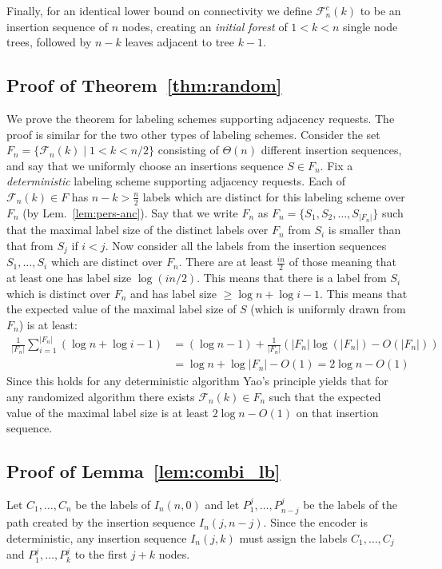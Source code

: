 \documentclass{llncs}
\newcommand{\abs}[1]{\left | #1 \right |}
\begin{document}
Finally, for an identical  lower bound on connectivity we define
$\mathcal{F}^c_n(k)$ to be an  insertion sequence   of  $n$ nodes, creating  an
\emph{initial  forest } of  $1 < k < n $ single node trees, followed by  $n-k$
leaves adjacent to tree $k-1$. 

\subsection{Proof of Theorem~\ref{thm:random}} \label{proof:random}
\newcommand{\F}{\mathcal{F}}
We  prove the theorem for labeling schemes supporting adjacency requests.
The proof is similar for the two other types of labeling schemes.
Consider the set $F_n = \{\F_n(k) \mid 1 < k < n/2\}$ consisting of $\Theta(n)$
different insertion sequences, and say that we uniformly choose an insertions
sequence $S \in F_n$.
Fix a \emph{deterministic} labeling scheme supporting adjacency requests.
Each of $\F_n(k) \in F$ has $n-k > \frac{n}{2}$
labels which are distinct for this labeling scheme over $F_n$ (by
Lem.~\ref{lem:pers-anc}).
Say that we write $F_n$ as $F_n = \{S_1, S_2,\ldots, S_{\abs{F_n}}\}$ such that
the maximal label size of the distinct labels over $F_n$ from $S_i$
is smaller than that from $S_j$ if $i < j$. Now consider all the labels from the
insertion sequences $S_1,\ldots,S_i$ which are distinct over $F_n$. There are at
least $\frac{in}{2}$ of those meaning that at least one has label size $\log(in/2)$.
This means that there is a label from $S_i$ which is distinct over $F_n$ and
has label size $\ge \log n + \log i - 1$. This means that the expected value of
the maximal label size of $S$ (which is uniformly drawn from $F_n$) is at least:
\begin{align*}
\frac{1}{\abs{F_n}} \sum_{i=1}^{\abs{F_n}}
\left ( \log n + \log i - 1 \right )
& =
(\log n - 1) +
\frac{1}{\abs{F_n}}
\left (
    \abs{F_n}\log(\abs{F_n}) - O(\abs{F_n})
\right )
\\
& =
\log n + \log \abs{F_n} - O(1)
=
2\log n - O(1)
\end{align*}
Since this holds for any deterministic algorithm Yao's principle yields that
for any randomized algorithm there exists $\F_n(k) \in F_n$ such that the
expected value of the maximal label size is at least $2\log n - O(1)$ on that
insertion sequence.

\subsection{Proof of Lemma~\ref{lem:combi_lb}} \label{Lemma-combi-bi}
    Let $C_1,\ldots, C_n$ be the labels of $I_n(n,0)$ and let $P^j_1,\ldots,
    P^j_{n-j}$ be the labels of the path created by the insertion sequence
    $I_n(j,n-j)$. Since the encoder is deterministic, any insertion sequence
    $I_n(j,k)$ must assign the labels $C_1,\ldots, C_j$
    and $P^j_1,\ldots, P^j_k$ to the first $j+k$ nodes.
\end{document}
